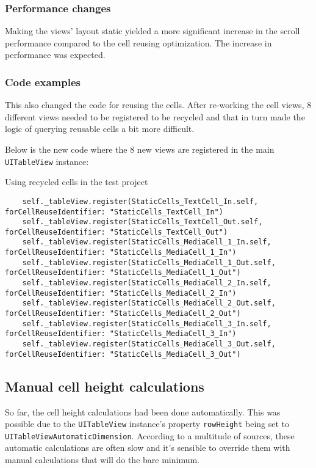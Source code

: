 \documentclass[a4paper,12pt]{article}
\begin{document}
\subsubsection*{Performance changes}
Making the views' layout static yielded a more significant increase in the scroll performance compared to the cell reusing optimization. The increase in performance was expected.


\subsubsection*{Code examples}
This also changed the code for reusing the cells. After re-working the cell views, 8 different views needed to be registered to be recycled and that in turn made the logic of querying reusable cells a bit more difficult.

Below is the new code where the 8 new views are registered in the main \texttt{UITableView} instance:
\begin{listing}[H]
  \caption{Using recycled cells in the test project}
  \begin{verbatim}
    self._tableView.register(StaticCells_TextCell_In.self, forCellReuseIdentifier: "StaticCells_TextCell_In")
    self._tableView.register(StaticCells_TextCell_Out.self, forCellReuseIdentifier: "StaticCells_TextCell_Out")
    self._tableView.register(StaticCells_MediaCell_1_In.self, forCellReuseIdentifier: "StaticCells_MediaCell_1_In")
    self._tableView.register(StaticCells_MediaCell_1_Out.self, forCellReuseIdentifier: "StaticCells_MediaCell_1_Out")
    self._tableView.register(StaticCells_MediaCell_2_In.self, forCellReuseIdentifier: "StaticCells_MediaCell_2_In")
    self._tableView.register(StaticCells_MediaCell_2_Out.self, forCellReuseIdentifier: "StaticCells_MediaCell_2_Out")
    self._tableView.register(StaticCells_MediaCell_3_In.self, forCellReuseIdentifier: "StaticCells_MediaCell_3_In")
    self._tableView.register(StaticCells_MediaCell_3_Out.self, forCellReuseIdentifier: "StaticCells_MediaCell_3_Out")
  \end{verbatim}
\end{listing}

\subsection{Manual cell height calculations}\label{subsection:ManualCellHeightCalculations}
So far, the cell height calculations had been done automatically. This was possible due to the \texttt{UITableView} instance's property \texttt{rowHeight} being set to \texttt{UITableViewAutomaticDimension}. According to a multitude of sources, these automatic calculations are often slow and it's sensible to override them with manual calculations that will do the bare minimum.\cite{PerfectSmoothScrollingInUITableViews}\cite{HowToMakeDynamicTableViewCellHeight}
\end{document}
